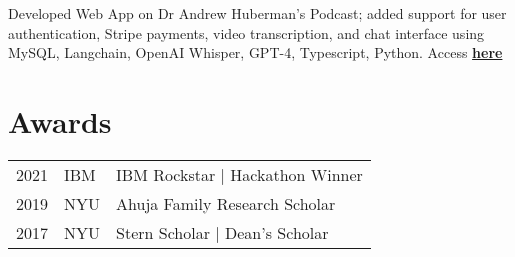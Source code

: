 \documentclass[]{deedy-resume-openfont}
\begin{document}
\begin{minipage}[t]{0.66\textwidth}
Developed Web App on Dr Andrew Huberman's Podcast; added support for user authentication, Stripe payments, video transcription, and chat interface using MySQL, Langchain, OpenAI Whisper, GPT-4, Typescript, Python. Access \href{https://www.huberman.fyi}{\bf here}
\sectionsep




\section{Awards} 
\begin{tabular}{rll}
2021	 & IBM & IBM Rockstar | Hackathon Winner \\
2019	 & NYU & Ahuja Family Research Scholar \\
2017     & NYU & Stern Scholar | Dean's Scholar \\
\end{tabular}
\sectionsep


% 
% 

\end{minipage} 
\end{document}
